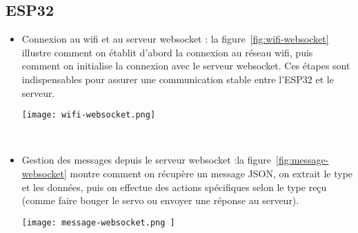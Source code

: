 \subsection{ESP32}
\begin{itemize}
	\item Connexion au wifi et au serveur websocket : la figure~\ref{fig:wifi-websocket} illustre comment on établit d’abord la connexion au réseau wifi, puis comment on initialise la connexion avec le serveur websocket. Ces étapes sont indispensables pour assurer une communication stable entre l’ESP32 et le serveur.\\
	
	\begin{minipage}{\linewidth}
  		\centering
  		\texttt{[image: wifi-websocket.png]}
  		\label{fig:wifi-websocket}
	\end{minipage}
	\\
	
	\item Gestion des messages depuis le serveur websocket :la figure~\ref{fig:message-websocket} montre comment on récupère un message JSON, on extrait le type et les données, puis on effectue des actions spécifiques selon le type reçu (comme faire bouger le servo ou envoyer une réponse au serveur).\\
	\begin{minipage}{\linewidth}
  		\centering
  		\texttt{[image: message-websocket.png	]}
  		\label{fig:message-websocket}
	\end{minipage}
\end{itemize}


